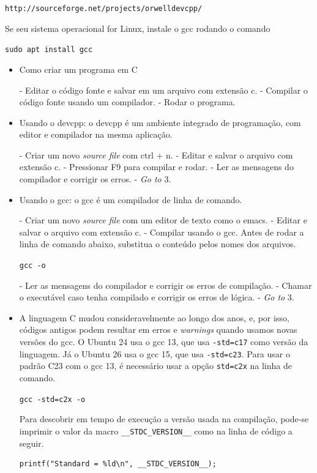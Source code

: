 {\tt http://sourceforge.net/projects/orwelldevcpp/}

Se seu sistema operacional for Linux, instale o gcc rodando o comando

{\tt sudo apt install gcc}

\begin{itemize}

\item Como criar um programa em C

 - Editar o código fonte e salvar em um arquivo com extensão c.
 - Compilar o código fonte usando um compilador.
 - Rodar o programa.

\item Usando o devcpp: o devcpp é um ambiente integrado de programação, com editor e compilador na mesma aplicação.

 - Criar um novo {\it source file} com ctrl + n.
 - Editar e salvar o arquivo com extensão c.
 - Pressionar F9 para compilar e rodar.
 - Ler as mensagens do compilador e corrigir os erros.
 - {\it Go to} 3.

\item Usando o gcc: o gcc é um compilador de linha de comando.

 - Criar um novo {\it source file} com um editor de texto como o emacs.
 - Editar e salvar o arquivo com extensão c.
 - Compilar usando o gcc. Antes de rodar a linha de comando abaixo, substitua o conteúdo {\tt{}} pelos nomes dos arquivos.

{\tt gcc  -o }

 - Ler as mensagens do compilador e corrigir os erros de compilação.
 - Chamar o executável caso tenha compilado e corrigir os erros de lógica.
 - {\it Go to} 3.

\item A linguagem C mudou consideravelmente ao longo dos anos, e, por isso, códigos antigos podem resultar em erros e \textit{warnings} quando usamos novas versões do gcc. O Ubuntu 24 usa o gcc 13, que usa {\tt -std=c17} como versão da linguagem. Já o Ubuntu 26 usa o gcc 15, que usa {\tt -std=c23}. Para usar o padrão C23 com o gcc 13, é necessário usar a opção {\tt std=c2x} na linha de comando.

{\tt gcc -std=c2x  -o }

\subitem Para descobrir em tempo de execução a versão usada na compilação, pode-se imprimir o valor da macro  {\tt \_\_STDC\_VERSION\_\_} como na linha de código a seguir.

\begin{lstlisting}
printf("Standard = %ld\n", __STDC_VERSION__);
\end{lstlisting}

\end{itemize}


